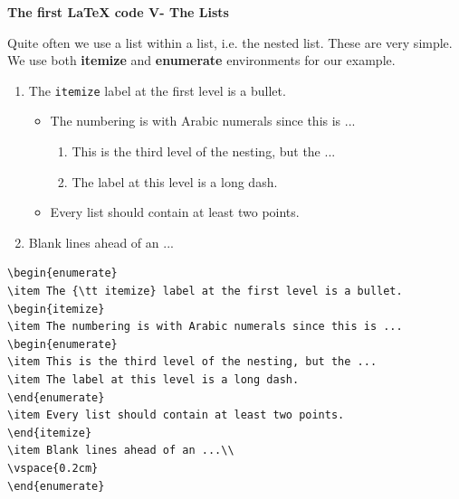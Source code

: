 \documentclass[xcolor=dvipsnames]{beamer}
\begin{document}
\begin{frame}[fragile]{\textbf{The first \LaTeX{} code V- The Lists}}



Quite often we use a list within a list, i.e. the nested list. These are very simple. We use both \textbf{itemize} and \textbf{enumerate} environments for our example. \\

\vspace{0.2cm}

\renewcommand\theenumii{\alph{enumii}}
\begin{enumerate}
\item The {\tt itemize} label at the first level is a bullet.
\begin{itemize}
\item The numbering is with Arabic numerals since this is ...
\begin{enumerate}
\item This is the third level of the nesting, but the ...
\item The label at this level is a long dash.
\end{enumerate}
\item Every list should contain at least two points.
\end{itemize}
\item Blank lines ahead of an ...\\
\vspace{0.2cm}
\end{enumerate}

\tiny 
\begin{minipage}{8cm}
\begin{Verbatim}[frame=single]
\begin{enumerate}
\item The {\tt itemize} label at the first level is a bullet.
\begin{itemize}
\item The numbering is with Arabic numerals since this is ...
\begin{enumerate}
\item This is the third level of the nesting, but the ...
\item The label at this level is a long dash.
\end{enumerate}
\item Every list should contain at least two points.
\end{itemize}
\item Blank lines ahead of an ...\\
\vspace{0.2cm}
\end{enumerate}
\end{Verbatim}
\end{minipage}


\end{frame}
\end{document}
